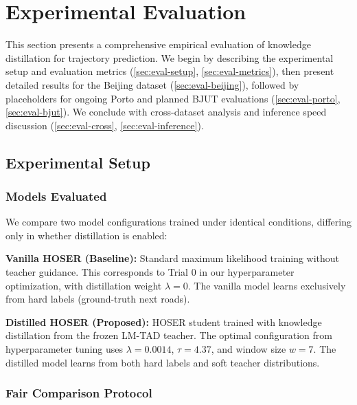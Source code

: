 
\section{Experimental Evaluation}
\label{sec:evaluation}

This section presents a comprehensive empirical evaluation of knowledge distillation for trajectory prediction. We begin by describing the experimental setup and evaluation metrics (\autoref{sec:eval-setup}, \autoref{sec:eval-metrics}), then present detailed results for the Beijing dataset (\autoref{sec:eval-beijing}), followed by placeholders for ongoing Porto and planned BJUT evaluations (\autoref{sec:eval-porto}, \autoref{sec:eval-bjut}). We conclude with cross-dataset analysis and inference speed discussion (\autoref{sec:eval-cross}, \autoref{sec:eval-inference}).

\subsection{Experimental Setup}
\label{sec:eval-setup}

\subsubsection{Models Evaluated}

We compare two model configurations trained under identical conditions, differing only in whether distillation is enabled:

\textbf{Vanilla HOSER (Baseline):} Standard maximum likelihood training without teacher guidance. This corresponds to Trial 0 in our hyperparameter optimization, with distillation weight $\lambda = 0$. The vanilla model learns exclusively from hard labels (ground-truth next roads).

\textbf{Distilled HOSER (Proposed):} HOSER student trained with knowledge distillation from the frozen LM-TAD teacher. The optimal configuration from hyperparameter tuning uses $\lambda = 0.0014$, $\tau = 4.37$, and window size $w = 7$. The distilled model learns from both hard labels and soft teacher distributions.

\subsubsection{Fair Comparison Protocol}

